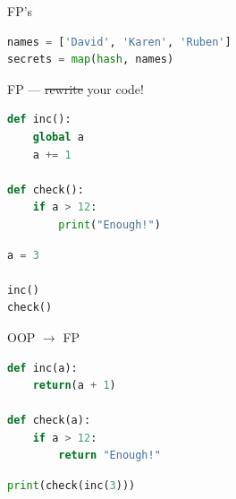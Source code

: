 \documentclass[aspectratio=169]{beamer}
\newcommand{\soutthick}[1]{%
    \renewcommand{\ULthickness}{5.4pt}%
       \sout{#1}%
    \renewcommand{\ULthickness}{.4pt}%
}
\begin{document}
\begin{frame}[fragile,t]
    \vspace{0.8em}
    \Huge{FP's }

    \begin{lstlisting}[language=Python]
names = ['David', 'Karen', 'Ruben']
secrets = map(hash, names)
    \end{lstlisting}
\end{frame}

\begin{frame}
    \HUGE
        \hspace{2.32em}\newline
        FP --- \soutthick{rewrite} your code!
\end{frame}

\begin{frame}[fragile,t]
    \begin{lstlisting}[language=Python]
def inc():
    global a
    a += 1

def check():
    if a > 12:
        print("Enough!")
    \end{lstlisting}
\end{frame}

\begin{frame}[fragile]
    \begin{lstlisting}[language=Python]
a = 3

inc()
check()
    \end{lstlisting}
\end{frame}

\begin{frame}
    \centering
        \Huge{OOP $\to$ FP}

        \vspace{1em}

\end{frame}

\begin{frame}[fragile,t]
    \begin{lstlisting}[language=Python]
def inc(a):
    return(a + 1)

def check(a):
    if a > 12:
        return "Enough!"
    \end{lstlisting}
\end{frame}

\begin{frame}[fragile]
    \begin{lstlisting}[language=Python]
print(check(inc(3)))
    \end{lstlisting}
\end{frame}
\end{document}
